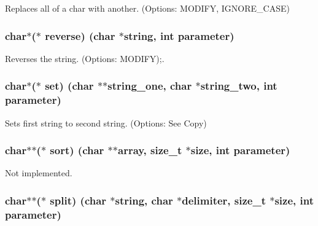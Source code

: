 Replaces all of a char with another. (Options\+: M\+O\+D\+I\+F\+Y, I\+G\+N\+O\+R\+E\+\_\+\+C\+A\+S\+E) 

\hypertarget{struct_string___utils_aabf2d796331e3bbc3d00e7d386b931f0}{}
\subsubsection[{reverse}]{\setlength{\rightskip}{0pt plus 5cm}char$\ast$($\ast$ reverse) (char $\ast$string, int parameter)}\label{struct_string___utils_aabf2d796331e3bbc3d00e7d386b931f0}


Reverses the string. (Options\+: M\+O\+D\+I\+F\+Y);. 

\hypertarget{struct_string___utils_a15fa9ed7b6ac4791b3d3885b69b361b0}{}
\subsubsection[{set}]{\setlength{\rightskip}{0pt plus 5cm}char$\ast$($\ast$ set) (char $\ast$$\ast$string\+\_\+one, char $\ast$string\+\_\+two, int parameter)}\label{struct_string___utils_a15fa9ed7b6ac4791b3d3885b69b361b0}


Sets first string to second string. (Options\+: See Copy) 

\hypertarget{struct_string___utils_a1f06d8659ad94939ae299f55d9ede495}{}
\subsubsection[{sort}]{\setlength{\rightskip}{0pt plus 5cm}char$\ast$$\ast$($\ast$ sort) (char $\ast$$\ast$array, size\+\_\+t $\ast$size, int parameter)}\label{struct_string___utils_a1f06d8659ad94939ae299f55d9ede495}


Not implemented. 

\hypertarget{struct_string___utils_a6e0ff9f0639b20ff2f8e890d9cd3a52e}{}
\subsubsection[{split}]{\setlength{\rightskip}{0pt plus 5cm}char$\ast$$\ast$($\ast$ split) (char $\ast$string, char $\ast$delimiter, size\+\_\+t $\ast$size, int parameter)}\label{struct_string___utils_a6e0ff9f0639b20ff2f8e890d9cd3a52e}


